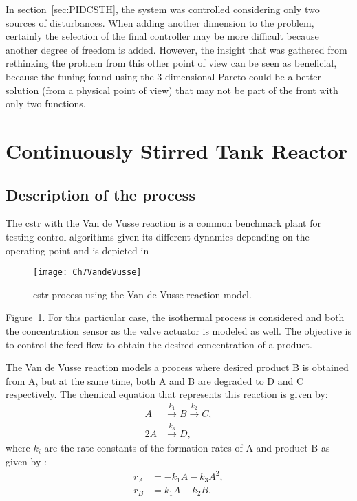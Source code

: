 In section~\ref{sec:PIDCSTH}, the system was controlled considering only two sources of disturbances. When adding another dimension to the problem, certainly the selection of the final controller may be more difficult because another degree of freedom is added. However, the insight that was gathered from rethinking the problem from this other point of view can be seen as beneficial, because the tuning found using the 3 dimensional Pareto could be a better solution (from a physical point of view) that may not be part of the front with only two functions.
%
%
\section{Continuously Stirred Tank Reactor}
\label{sec:CSTRVandeVusse}
%
\subsection{Description of the process}
\label{sec:DescriptionCSTR}

The \gls{cstr} with the Van de Vusse reaction \citep{VandeVusse1964} is a common benchmark plant for testing control algorithms given its different dynamics depending on the operating point and is depicted in %
\begin{figure}[tb]
	\centering
	\texttt{[image: Ch7VandeVusse]}
	\caption{\gls{cstr} process using the Van de Vusse reaction model.}
	\label{fig:Ch7VandeVusse}
\end{figure}
%
Figure~\ref{fig:Ch7VandeVusse}. For this particular case, the isothermal process is considered and both the concentration sensor as the valve actuator is modeled as well. The objective is to control the feed flow to obtain the desired concentration of a product.

The Van de Vusse reaction models a process where desired product B is obtained from A, but at the same time, both A and B are degraded to D and C respectively. The chemical equation that represents this reaction is given by:
%
\begin{align*}
A &\overset{k_1}{\longrightarrow} B \overset{k_2}{\longrightarrow}C,\\
2 A &\overset{k_3}{\longrightarrow} D,
\end{align*}
%
where $k_i$ are the rate constants of the formation rates of A and product B as given by \citep{VandeVusse1964}:
\begin{equation}
\begin{split}
r_A &= -k_1 A - k_3 A^2,\\
r_B &= k_1 A - k_2 B.
\end{split}
\label{eq:RateVandeVusse}
\end{equation}

